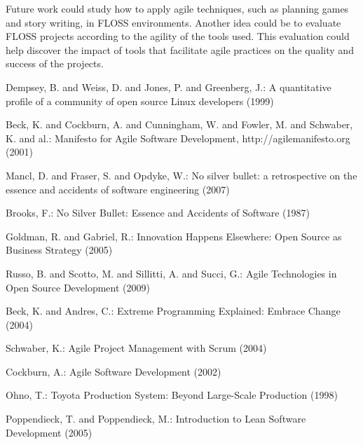 \documentclass[lnbip]{svmultln}
\begin{document}
Future work could study how to apply agile techniques, such as
planning games and story writing, in FLOSS environments. Another idea
could be to evaluate FLOSS projects according to the agility of the
tools used. This evaluation could help discover the impact of tools
that facilitate agile practices on the quality and success of the
projects.



\begin{thebibliography}{5}

 Dempsey, B. and Weiss, D. and Jones,
  P. and Greenberg, J.: A quantitative profile of a community of open
  source Linux developers (1999)

 Beck, K. and Cockburn, A. and Cunningham,
  W. and Fowler, M. and Schwaber, K. and al.: Manifesto for Agile
  Software Development, http://agilemanifesto.org (2001)

 Mancl, D. and Fraser, S. and Opdyke,
  W.: No silver bullet: a retrospective on the essence and accidents
  of software engineering (2007)

 Brooks, F.: No Silver Bullet: Essence and
  Accidents of Software (1987)

 Goldman, R. and Gabriel, R.: Innovation Happens
  Elsewhere: Open Source as Business Strategy (2005)

 Russo, B. and Scotto, M. and Sillitti, A. and
  Succi, G.: Agile Technologies in Open Source Development (2009)

 Beck, K. and Andres, C.: Extreme Programming
  Explained: Embrace Change (2004)

 Schwaber, K.: Agile Project Management with
  Scrum (2004)

 Cockburn, A.: Agile Software Development (2002)

 Ohno, T.: Toyota Production System: Beyond
  Large-Scale Production (1998)

 Poppendieck, T. and Poppendieck, M.:
  Introduction to Lean Software Development (2005)


\end{thebibliography}
\end{document}
